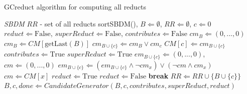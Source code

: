 \documentclass[number,preprint,review,12pt]{elsarticle}
\begin{document}
	\begin{algorithm}
	\footnotesize
	\caption{GCreduct algorithm for computing all reducts}
	\label{alg:GCreduct}
	\begin{algorithmic}[1]
	  \Require \textit{SBDM}
      \Ensure $RR$ - set of all reducts
	  \State sortSBDM(), $B \Leftarrow \emptyset$, $RR \Leftarrow \emptyset$, $c \Leftarrow 0$
	  \State $reduct \Leftarrow \mathrm{False}$, $superReduct \Leftarrow \mathrm{False}$, 
	  		 $contributes \Leftarrow \mathrm{False}$
	  	\label{line:emptyB}
	  		\State $cm_B \Leftarrow (0,...,0)$
	  	\Else
	  		\State $cm_B \Leftarrow CM[\mathrm{getLast}(B)]$\label{line:notEmpty}
	  	\EndIf
	  	\State $cm_{B\cup \lbrace c\rbrace} \Leftarrow cm_B \vee cm_c$\label{line:updateCM}
	  	\State $CM[c] \Leftarrow cm_{B\cup \lbrace c\rbrace}$
	  	\label{line:contrib}
	  		\State $contributes \Leftarrow \mathrm{True}$
	  		\label{line:superReduct}
	  			\State $superReduct \Leftarrow \mathrm{True}$
	  			\State $em_{B\cup \lbrace c\rbrace} \Leftarrow (0,...,0)$, $cm \Leftarrow (0,...,0)$
	  			 \label{line:em}
	  				\State $em_{B\cup \lbrace c\rbrace} \Leftarrow (em_{B\cup \lbrace c\rbrace}\wedge \neg 
	  						cm_x) \vee (\neg cm \wedge cm_x)$
	  				\State $cm \Leftarrow CM[x]$\label{line:emEnd}
	  			\EndFor
	  			\State $reduct \Leftarrow \mathrm{True}$\label{line:reduct}
	  					\State $reduct \Leftarrow \mathrm{False}$
	  					\State \textbf{break}\label{line:reductEnd}
	  				\EndIf
	  			\EndFor
	  				\State $RR \Leftarrow RR \cup \lbrace B\cup \lbrace c\rbrace \rbrace$
	  			\EndIf
	  		\EndIf
	  	\EndIf
		\State $B,c,done \Leftarrow CandidateGenerator(B,c,contributes,superReduct,reduct)$
	  \EndWhile 
		\end{algorithmic}
	\end{algorithm}
	
\end{document}
